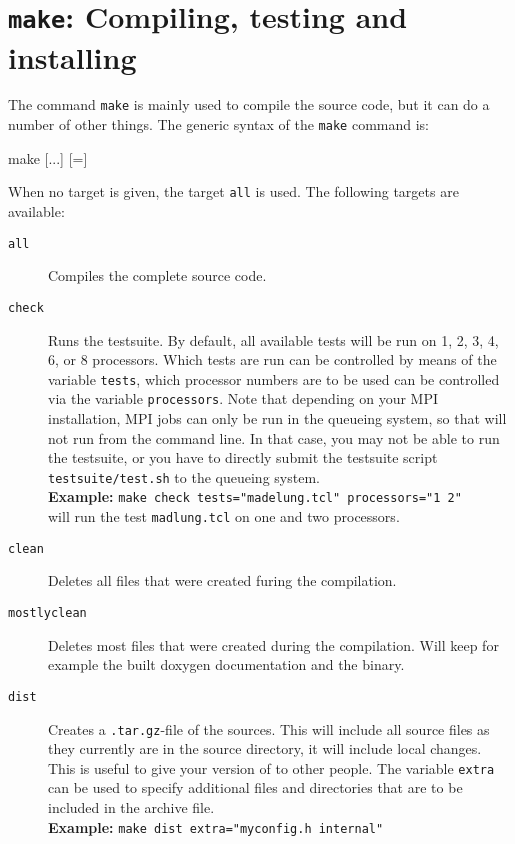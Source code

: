\section{\texttt{make}: Compiling,  testing and installing \es}
\label{sec:make}

The command \texttt{make} is mainly used to compile the \es{} source
code, but it can do a number of other things. The generic syntax of
the \texttt{make} command is:
\begin{code}
make [...] [=]
\end{code}
When no target is given, the target \texttt{all} is used. The
following targets are available:
\begin{description}
\item[\texttt{all}] Compiles the complete \es{} source code.
\item[\texttt{check}] Runs the testsuite. By default, all available
  tests will be run on 1, 2, 3, 4, 6, or 8 processors. Which tests are
  run can be controlled by means of the variable \texttt{tests}, which
  processor numbers are to be used can be controlled via the variable
  \texttt{processors}. Note that depending on your MPI installation,
  MPI jobs can only be run in the queueing system, so that \es{} will
  not run from the command line. In that case, you may not be able to
  run the testsuite, or you have to directly submit the testsuite script
  \verb!testsuite/test.sh! to the queueing system.\\
  \textbf{Example:} \verb!make check tests="madelung.tcl" processors="1 2"!\\
  will run the test \texttt{madlung.tcl} on one and two processors.
\item[\texttt{clean}] Deletes all files that were created furing the
  compilation.
\item[\texttt{mostlyclean}] Deletes most files that were created
  during the compilation. Will keep for example the built doxygen
  documentation and the \es{} binary.
\item[\texttt{dist}] Creates a \texttt{.tar.gz}-file of the \es{}
  sources.  This will include all source files as they currently are
  in the source directory, \ie{} it will include local changes.  This
  is useful to give your version of \es{} to other people.
  The variable \texttt{extra} can be used to specify additional
  files and directories that are to be included in the archive
  file. \\
  \textbf{Example:} \verb!make dist extra="myconfig.h internal"!\\

\end{description}
